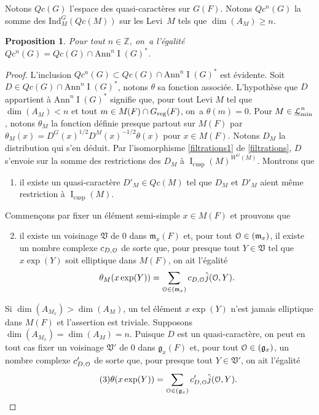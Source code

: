 \documentclass[11pt]{article}
\numberwithin{equation}{section}\providecommand{\og}{«\,}\providecommand{\fg}{\,»}
\let\mathcal \EuScript
\newcommand{\NoChangel}[1]{%
\expandafter\let\csname old\string#1\endcsname=#1
\let#1=\relax
\newcommand{#1}{\mathcode`l="716C\csname old\string#1\endcsname\mathcode`l="7160 }%
}
\newcommand{\frg}{\mathfrak{g}}
\newcommand{\mfrm}{\mathfrak{m}}
\newcommand{\frV}{\mathfrak{V}}
\newcommand{\Ann}{\mathrm{Ann}}
\newcommand{\cusp}{\mathrm{cusp}}
\newcommand{\rell}{\mathrm{ell}} \NoChangel{\rell}
\newcommand{\Ind}{\mathrm{Ind}}
\newcommand{\Nil}{\mathrm{Nil}} \NoChangel{\Nil}
\newcommand{\reg}{\mathrm{reg}}
\DeclareMathOperator{\rI}{I}
\newcommand{\cL}{\mathcal{L}}
\newcommand{\cO}{\mathcal{O}}
\newcommand{\ZZ}{\mathbb{Z}}
\theoremstyle{plain}
\newtheorem*{prop*}{Proposition}
\theoremstyle{definition}
\begin{document}
Notons $Qc(G)$ l'espace des quasi-caractères sur $G(F)$. Notons $Qc^n(G)$ la somme des $\Ind_{M}^G(Qc(M))$ sur les Levi~$M$ tels que $\dim(A_{M})\geq n$.

\begin{prop*}
Pour tout $n\in \ZZ$, on~a l'égalité
$Qc^n(G)=Qc(G)\cap \Ann^n\rI(G)^*$.
\end{prop*}

\begin{proof}
L'inclusion $Qc^n(G)\subset Qc(G)\cap \Ann^n\rI(G)^*$ est évidente. Soit $D\in Qc(G)\cap \Ann^n\rI(G)^*$, notons $\theta$ sa fonction associée. L'hypothèse que $D$ appartient à $\Ann^n\rI(G)^*$ signifie que, pour tout Levi $M$ tel que $\dim(A_{M})<n$ et tout $m\in M_{\rell}(F)\cap G_{\reg}(F)$, on~a $\theta(m)=0$. Pour $M\in \underline{\cL}_{\min}^n$, notons $\theta_{M}$ la fonction définie presque partout sur $M(F)$ par $\theta_{M}(x)=D^G(x)^{1/2}D^M(x)^{-1/2}\theta(x)$ pour $x\in M(F)$. Notons $D_{M}$ la distribution qui s'en déduit.
Par l'isomorphisme \eqref{filtrations1} de \ref{filtrations}, $D$ s'envoie sur la somme des restrictions des $D_{M}$ à $\rI_{\cusp}(M)^{W^G(M)}$. Montrons que
\begin{enumerate}
\item\label{filtrationsurlegroupe1}
il existe un quasi-caractère $D'_{M}\in Qc(M)$ tel que $D_{M}$ et $D'_{M}$ aient même restriction à $\rI_{\cusp}(M)$.
\end{enumerate}

Commençons par fixer un élément semi-simple $x\in M(F)$ et prouvons que
\begin{enumerate}\setcounter{enumi}{1}
\item\label{filtrationsurlegroupe2}
il existe un voisinage $\frV$ de $0$ dans $\mfrm_{x}(F)$ et, pour tout $\cO\in \Nil(\mfrm_{x})$, il existe un nombre complexe $c_{D,\cO}$ de sorte que, pour presque tout $Y\in \frV$ tel que $x \exp(Y)$ soit elliptique dans $M(F)$, on ait l'égalité
\[
\theta_{M}(x \exp(Y))=\sum_{\cO\in \Nil(\mfrm_{x})}c_{D,\cO}\hat{j}(\cO,Y).
\]
\end{enumerate}

Si $\dim(A_{M_{x}})> \dim(A_{M})$, un tel élément $x \exp(Y)$ n'est jamais elliptique dans $M(F)$ et l'assertion est triviale. Supposons $\dim(A_{M_{x}})=\dim(A_{M})=n$. Puisque $D$ est un quasi-caractère, on peut en tout cas fixer un voisinage $\frV'$ de $0$ dans $\frg_{x}(F)$ et, pour tout $\cO\in \Nil(\frg_{x})$, un nombre complexe $c'_{D,\cO}$ de sorte que, pour presque tout $Y\in \frV'$, on ait l'égalité
\begin{equation}\tag{3}\label{filtrationsurlegroupe3}
\theta(x \exp(Y))=\sum_{\cO\in \Nil(\frg_{x})}c'_{D,\cO}\hat{j}(\cO,Y).
\end{equation}


\end{proof}
\end{document}

